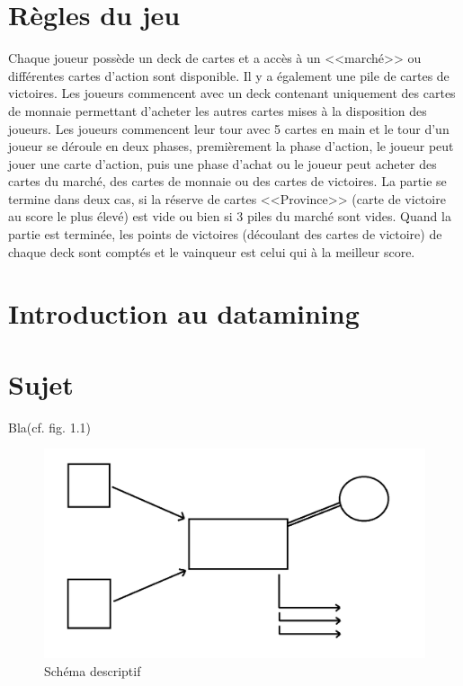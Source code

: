 \section{Règles du jeu}
Chaque joueur possède un deck de cartes et a accès à un <<marché>> ou différentes cartes d'action sont disponible. Il y a également une pile de cartes de victoires.
\newline Les joueurs commencent avec un deck contenant uniquement des cartes de monnaie permettant d'acheter les autres cartes mises à la disposition des joueurs. Les joueurs commencent leur tour avec 5 cartes en main et le tour d'un joueur se déroule en deux phases, premièrement la phase d'action, le joueur peut jouer une carte d'action, puis une phase d'achat ou le joueur peut acheter des cartes du marché, des cartes de monnaie ou des cartes de victoires.
\newline La partie se termine dans deux cas, si la réserve de cartes <<Province>> (carte de victoire au score le plus élevé) est vide ou bien si 3 piles du marché sont vides. Quand la partie est terminée, les points de victoires (découlant des cartes de victoire) de chaque deck sont comptés et le vainqueur est celui qui à la meilleur score.

\section{Introduction au datamining}


\section{Sujet}

Bla(cf. fig. 1.1)\\

\begin{figure}[!h]
\begin{center}
\includegraphics[width=15cm]{presentation/schema}
\end{center}
\caption{Schéma descriptif}
\end{figure}

